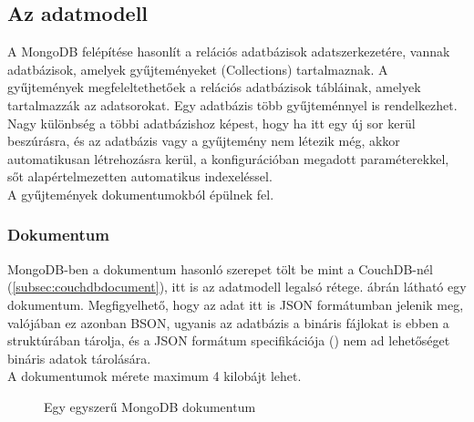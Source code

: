 	\subsection{Az adatmodell}
		A MongoDB felépítése hasonlít a relációs adatbázisok adatszerkezetére, vannak adatbázisok, amelyek gyűjteményeket (Collections) tartalmaznak. A gyűjtemények megfeleltethetőek a relációs adatbázisok tábláinak, amelyek tartalmazzák az adatsorokat. Egy adatbázis több gyűjteménnyel is rendelkezhet.
		Nagy különbség a többi adatbázishoz képest, hogy ha itt egy új sor kerül beszúrásra, és az adatbázis vagy a gyűjtemény nem létezik még, akkor automatikusan létrehozásra kerül, a konfigurációban megadott paraméterekkel, sőt alapértelmezetten automatikus indexeléssel.\\
		A gyűjtemények dokumentumokból épülnek fel.
		
		\subsubsection{Dokumentum}
			MongoDB-ben a dokumentum hasonló szerepet tölt be mint a CouchDB-nél (\ref{subsec:couchdbdocument}), itt is az adatmodell legalsó rétege.  ábrán látható egy dokumentum. Megfigyelhető, hogy az adat itt is JSON formátumban jelenik meg, valójában ez azonban BSON, ugyanis az adatbázis a bináris fájlokat is ebben a struktúrában tárolja, és a JSON formátum specifikációja () nem ad lehetőséget bináris adatok tárolására.\hfill\\
			A dokumentumok mérete maximum 4 kilobájt lehet.
			
			\begin{figure}[ht]
				\centering
					
					\caption{Egy egyszerű MongoDB dokumentum}
					\label{fig:mongodbsimple}
			\end{figure}
			
